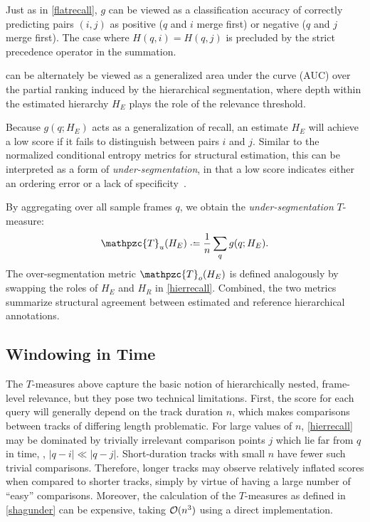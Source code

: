 \documentclass{article}
\def\shag{\ensuremath{\mathpzc{T}}}
\begin{document}
Just as in \cref{flatrecall}, $g$ can be viewed as a classification accuracy of correctly predicting pairs $(i, j)$ as positive ($q$ and $i$ merge first) or negative ($q$ and $j$ merge first).
The case where $H(q, i) = H(q, j)$ is precluded by the strict precedence operator in the summation.

 can be alternately be viewed as a generalized area under the curve (AUC) over the partial ranking induced by the hierarchical segmentation, where depth within the estimated hierarchy $H_E$ plays the role of the relevance threshold.

Because $g(q; H_E)$ acts as a generalization of recall, an estimate $H_E$ will achieve a low score if it fails to distinguish between pairs $i$ and $j$.
Similar to the normalized conditional entropy metrics for structural estimation, this can be interpreted as a form of \emph{under-segmentation}, in that a low score indicates either an ordering error or a lack of specificity~\cite{Lukashevich2008}.  

By aggregating over all sample frames $q$, we obtain the \emph{under-segmentation} $T$-measure:
\begin{equation}
\shag_u(H_E) \defeq \frac{1}{n} \sum_q g(q ; H_E).\label{shagunder}
\end{equation}
The over-segmentation metric $\shag_o(H_E)$ is defined analogously by swapping the roles of $H_E$ and $H_R$ in \cref{hierrecall}.
Combined, the two metrics summarize structural agreement between estimated and reference hierarchical annotations.


\subsection{Windowing in Time}

The $T$-measures above capture the basic notion of hierarchically nested, frame-level relevance, but they pose two technical limitations.
First, the score for each query will generally depend on the track duration $n$, which makes comparisons between tracks of differing length problematic.  
For large values of $n$, \cref{hierrecall} may be dominated by trivially irrelevant comparison points $j$ which lie far from $q$ in time, \ie, $|q-i| \ll |q-j|$.
Short-duration tracks with small $n$ have fewer such trivial comparisons.
Therefore, longer tracks may observe relatively inflated scores when compared to shorter tracks, simply by virtue of having a large number of ``easy'' comparisons.
Moreover, the calculation of the $T$-measures as defined in \cref{shagunder} can be expensive, taking $\mathcal{O}(n^3)$ using a direct implementation.
\end{document}
